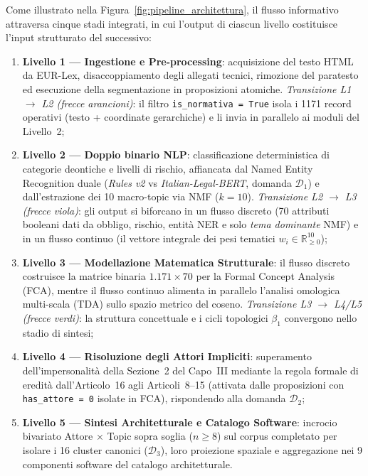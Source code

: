 \documentclass[12pt,a4paper,oneside]{report}
\begin{document}
Come illustrato nella Figura~\ref{fig:pipeline_architettura}, il flusso informativo attraversa cinque stadi integrati, in cui l'output di ciascun livello costituisce l'input strutturato del successivo:
\begin{enumerate}
    \item \textbf{Livello 1 --- Ingestione e Pre-processing}: acquisizione del testo HTML da EUR-Lex, disaccoppiamento degli allegati tecnici, rimozione del paratesto ed esecuzione della segmentazione in proposizioni atomiche. \emph{Transizione L1 $\to$ L2 (frecce arancioni)}: il filtro \texttt{is\_normativa = True} isola i \num{1171} record operativi (testo + coordinate gerarchiche) e li invia in parallelo ai moduli del Livello~2;
    \item \textbf{Livello 2 --- Doppio binario NLP}: classificazione deterministica di categorie deontiche e livelli di rischio, affiancata dal Named Entity Recognition duale (\emph{Rules v2} vs \emph{Italian-Legal-BERT}, domanda \textbf{$\mathcal{D}_1$}) e dall'estrazione dei 10 macro-topic via NMF ($k=10$). \emph{Transizione L2 $\to$ L3 (frecce viola)}: gli output si biforcano in un flusso discreto (70 attributi booleani dati da obbligo, rischio, entità NER e solo \emph{tema dominante} NMF) e in un flusso continuo (il vettore integrale dei pesi tematici $w_i \in \mathbb{R}_{\ge 0}^{10}$);
    \item \textbf{Livello 3 --- Modellazione Matematica Strutturale}: il flusso discreto costruisce la matrice binaria $1.171 \times 70$ per la Formal Concept Analysis (FCA), mentre il flusso continuo alimenta in parallelo l'analisi omologica multi-scala (TDA) sullo spazio metrico del coseno. \emph{Transizione L3 $\to$ L4/L5 (frecce verdi)}: la struttura concettuale e i cicli topologici $\beta_1$ convergono nello stadio di sintesi;
    \item \textbf{Livello 4 --- Risoluzione degli Attori Impliciti}: superamento dell'impersonalità della Sezione~2 del Capo~III mediante la regola formale di eredità dall'Articolo~16 agli Articoli~8--15 (attivata dalle proposizioni con \texttt{has\_attore = 0} isolate in FCA), rispondendo alla domanda \textbf{$\mathcal{D}_2$};
    \item \textbf{Livello 5 --- Sintesi Architetturale e Catalogo Software}: incrocio bivariato Attore $\times$ Topic sopra soglia ($n \ge 8$) sul corpus completato per isolare i 16 cluster canonici (\textbf{$\mathcal{D}_3$}), loro proiezione spaziale e aggregazione nei 9 componenti software del catalogo architetturale.
\end{enumerate}
\end{document}
